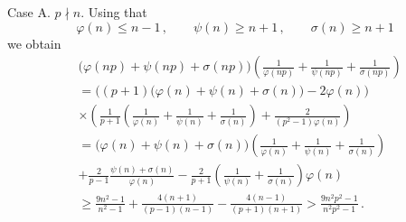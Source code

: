 \documentclass[12pt]{article}
\begin{document}
Case A.  \;  $p\nmid n$. Using that
\begin{equation*}
\varphi(n)\leq n-1\,, \qquad \psi(n)\geq n+1 \,, \qquad \sigma(n)\geq n+1
\end{equation*}
we obtain
\begin{align*}
&\big(\varphi(np)+\psi(np)+\sigma(np)\big)\left(\frac{1}{\varphi(np)}+\frac{1}{\psi(np)}+\frac{1}{\sigma(np)}\right)\\
&=\Big((p+1)\big(\varphi(n)+\psi(n)+\sigma(n)\big)-2\varphi(n)\Big)\\
&\times\left(\frac{1}{p+1}\left(\frac{1}{\varphi(n)}+\frac{1}{\psi(n)}+\frac{1}{\sigma(n)}\right)+\frac{2}{(p^2-1)\varphi(n)}\right)\\
&=\big(\varphi(n)+\psi(n)+\sigma(n)\big)\left(\frac{1}{\varphi(n)}+\frac{1}{\psi(n)}+\frac{1}{\sigma(n)}\right)\\
&+\frac{2}{p-1}\frac{\psi(n)+\sigma(n)}{\varphi(n)}-\frac{2}{p+1}\left(\frac{1}{\psi(n)}+\frac{1}{\sigma(n)}\right)\varphi(n)\\
&\geq\frac{9n^2-1}{n^2-1}+\frac{4\left(n+1\right)}{\left(p-1\right)\left(n-1\right)}-\frac{4\left(n-1\right)}{\left(p+1\right)\left(n+1\right)}>\frac{9n^2p^2-1}{n^2p^2-1}\,.
\end{align*}
\end{document}
